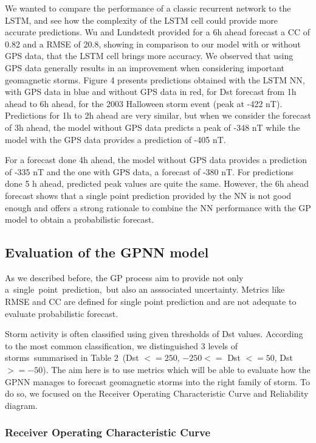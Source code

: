 We wanted to compare the performance of a classic recurrent network to the LSTM, and see 
how the complexity of the LSTM cell could provide more accurate predictions. Wu and Lundstedt \cite{wu1997geomagnetic} 
provided for a 6h ahead forecast a CC of 0.82 and a RMSE of 20.8, showing in comparison to our model with or 
without GPS data, that the LSTM cell brings more accuracy. We observed that using GPS data generally results 
in an improvement when considering important geomagnetic storms. Figure 4 presents predictions obtained with 
the LSTM NN, with GPS data in blue and without GPS data in red, for Dst forecast from 1h ahead to 6h ahead, 
for the 2003 Halloween storm event (peak at -422 nT). Predictions for 1h to 2h ahead are very similar, but when 
we consider the forecast of 3h ahead, the model without GPS data predicts a peak of -348 nT while the model 
with the GPS data provides a prediction of -405 nT. 

For a forecast done 4h ahead, the model without GPS data 
provides a prediction of -335 nT and the one with GPS data, a forecast of -380 nT. For predictions done 5 h ahead, 
predicted peak values are quite the same. However, the 6h ahead forecast shows that a single point prediction 
provided by the NN is not good enough and offers a strong rationale to combine the NN performance with the 
GP model to obtain a probabilistic forecast. 


\subsection{Evaluation of the GPNN model}

As we described before, the GP process aim to provide not only a\ single\ point\ prediction,\ 
but also an asssociated  uncertainty. Metrics like RMSE and CC are defined for single point prediction 
and  are not adequate  to evaluate  probabilistic forecast.


Storm activity is often classified using given thresholds of Dst values. According to the most common 
classification, we distinguished 3 levels of storms summarised in Table 2\ 
(Dst $<= 250$, $-250 <=$ Dst $<= 50$, Dst $>= -50$). The aim here is to use metrics which will be able to evaluate 
how the GPNN manages to forecast geomagnetic storms into the right family of storm. To do so, 
we focused on the Receiver Operating Characteristic Curve and Reliability diagram.



\subsubsection{Receiver Operating Characteristic Curve}


